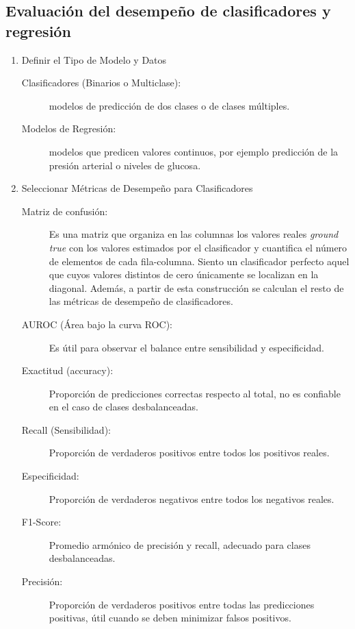 \documentclass[12pt,letterpaper,spanish, twoside]{article}
\begin{document}
\subsection{Evaluación del desempeño de clasificadores y regresión}
\begin{enumerate}
    \item Definir el Tipo de Modelo y Datos
    \begin{description}
        \item[Clasificadores (Binarios o Multiclase):] modelos de predicción de dos clases o de clases múltiples.
        \item[Modelos de Regresión:] modelos que predicen valores continuos, por ejemplo predicción de la presión arterial o niveles de glucosa.
    \end{description}

    \item Seleccionar Métricas de Desempeño para Clasificadores
    \begin{description}
        \item[Matriz de confusión:] Es una matriz que organiza en las columnas los valores reales \textit{ground true} con los valores estimados por el clasificador y cuantifica el número de elementos de cada fila-columna. Siento un clasificador perfecto aquel que cuyos valores distintos de cero únicamente se localizan en la diagonal. Además, a partir de esta construcción se calculan el resto de las métricas de desempeño de clasificadores.
        \item[AUROC (Área bajo la curva ROC):] Es útil para observar el balance entre sensibilidad y especificidad.
        \item[Exactitud (accuracy):] Proporción de predicciones correctas respecto al total, no es confiable en el caso de clases desbalanceadas.
        \item[Recall (Sensibilidad):] Proporción de verdaderos positivos entre todos los positivos reales.
        \item[Especificidad:] Proporción de verdaderos negativos entre todos los negativos reales.
        \item[F1-Score:] Promedio armónico de precisión y recall, adecuado para clases desbalanceadas.
        \item[Precisión:] Proporción de verdaderos positivos entre todas las predicciones positivas, útil cuando se deben minimizar falsos positivos.
    \end{description}


\end{enumerate}
\end{document}
